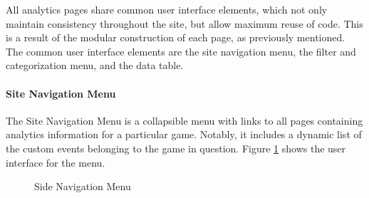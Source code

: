 All analytics pages share common user interface elements, which not only maintain consistency throughout the site, but allow maximum reuse of code. This is a result of the modular construction of each page, as previously mentioned. The common user interface elements are the site navigation menu, the filter and categorization menu, and the data table. 

\paragraph{Site Navigation Menu}

The Site Navigation Menu is a collapsible menu with links to all pages containing analytics information for a particular game. Notably, it includes a dynamic list of the custom events belonging to the game in question. Figure \ref{fig:nav_menu} shows the user interface for the menu.

\begin{figure}[htb]
	\caption{\label{fig:nav_menu} Side Navigation Menu}
\end{figure}

